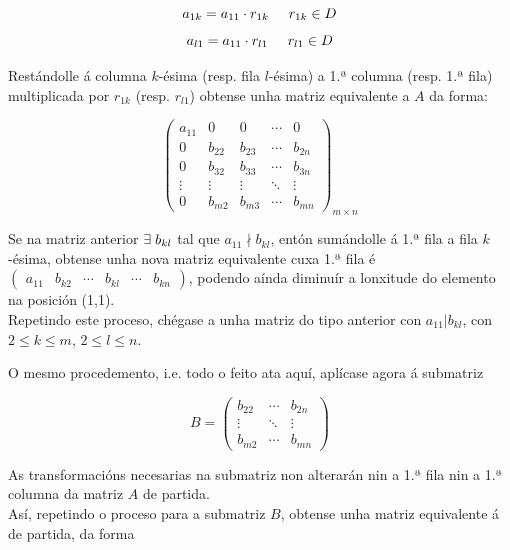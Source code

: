 \documentclass[twoside]{report}
\theoremstyle{mystyle}
\begin{document}
\begin{enumerate}
    $$
    a_{1k} = a_{11} \cdot r_{1k} \hspace{5mm} r_{1k} \in D
    $$
    $$
    a_{l1} = a_{11} \cdot r_{l1} \hspace{5mm} r_{l1} \in D
    $$
    
    Restándolle á columna $k$-ésima (resp. fila $l$-ésima) a 1.ª columna (resp. 1.ª fila) multiplicada por $r_{1k}$ (resp. $r_{l1}$) obtense unha matriz equivalente a $A$ da forma:
    
    $$
    \begin{pmatrix}
    a_{11} & 0 & 0 & \cdots & 0 \\
    0 & b_{22} & b_{23} & \cdots & b_{2n} \\
    0 & b_{32} & b_{33} & \cdots & b_{3n} \\
    \vdots & \vdots & \vdots & \ddots & \vdots \\
    0 & b_{m2} & b_{m3} & \cdots & b_{mn}
    \end{pmatrix}_{m \times n}
    $$
    
    Se na matriz anterior $\exists \hspace{1mm} b_{kl}$ tal que $a_{11} \nmid b_{kl}$, entón sumándolle á 1.ª fila a fila $k$-ésima, obtense unha nova matriz equivalente cuxa 1.ª fila é $\begin{pmatrix} a_{11} & b_{k2} & \cdots & b_{kl} & \cdots & b_{kn} \end{pmatrix}$, podendo aínda diminuír a lonxitude do elemento na posición (1,1).\\
    
    Repetindo este proceso, chégase a unha matriz do tipo anterior con $a_{11} | b_{kl}$, con $2 \leq k \leq m$, $2 \leq l \leq n$.\\
    
\end{enumerate}

\noindent O mesmo procedemento, i.e. todo o feito ata aquí, aplícase agora á submatriz

$$
B = \begin{pmatrix}
b_{22} & \cdots & b_{2n}\\
\vdots & \ddots & \vdots \\
b_{m2} & \cdots & b_{mn}
\end{pmatrix}
$$

\noindent As transformacións necesarias na submatriz non alterarán nin a 1.ª fila nin a 1.ª columna da matriz $A$ de partida.\\

\noindent Así, repetindo o proceso para a submatriz $B$, obtense unha matriz equivalente á de partida, da forma
\end{document}
